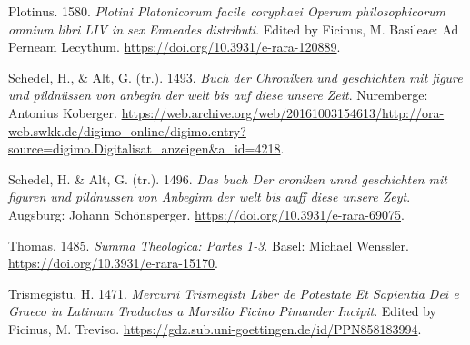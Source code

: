 \documentclass[
]{article}
\newlength{\cslhangindent}
\newlength{\cslentryspacingunit} %
\newenvironment{CSLReferences}[2] %
 {%
  \setlength{\parindent}{0pt}
  \ifodd #1
  \let\oldpar\par
  \def\par{\hangindent=\cslhangindent\oldpar}
  \fi
  \setlength{\parskip}{#2\cslentryspacingunit}
 }%
 {}
\begin{document}
\begin{CSLReferences}{1}{0}
\leavevmode{}%
Plotinus. 1580. \emph{{Plotini Platonicorum facile coryphaei Operum
philosophicorum omnium libri LIV in sex Enneades distributi}}. Edited by
Ficinus, M. Basileae: Ad Perneam Lecythum.
\url{https://doi.org/10.3931/e-rara-120889}.

\leavevmode{}%
Schedel, H., \& Alt, G. (tr.). 1493. \emph{{Buch der Chroniken und
geschichten mit figure und pildnüssen von anbegin der welt bis auf diese
unsere Zeit}}. Nuremberge: Antonius Koberger.
\url{https://web.archive.org/web/20161003154613/http://ora-web.swkk.de/digimo_online/digimo.entry?source=digimo.Digitalisat_anzeigen\&a_id=4218}.

\leavevmode{}%
Schedel, H. \& Alt, G. (tr.). 1496. \emph{{Das buch Der croniken unnd
geschichten mit figuren und pildnussen von Anbeginn der welt bis auff
diese unsere Zeyt}}. Augsburg: Johann Schönsperger.
\url{https://doi.org/10.3931/e-rara-69075}.

\leavevmode{}%
Thomas. 1485. \emph{Summa Theologica: Partes 1-3}. Basel: Michael
Wenssler. \url{https://doi.org/10.3931/e-rara-15170}.

\leavevmode{}%
Trismegistu, H. 1471. \emph{Mercurii Trismegisti Liber de Potestate Et
Sapientia Dei e Graeco in Latinum Traductus a Marsilio Ficino Pimander
Incipit}. Edited by Ficinus, M. Treviso.
\url{https://gdz.sub.uni-goettingen.de/id/PPN858183994}.

\end{CSLReferences}
\end{document}
